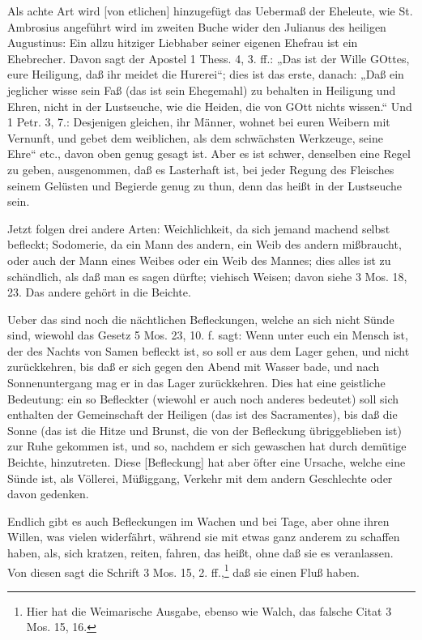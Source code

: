 Als achte Art wird [von etlichen] hinzugefügt das Uebermaß der Eheleute, wie St. Ambrosius angeführt wird im zweiten Buche wider den Julianus des heiligen Augustinus: Ein allzu hitziger Liebhaber seiner eigenen Ehefrau ist ein Ehebrecher. Davon sagt der Apostel 1 Thess. 4, 3. ff.: „Das ist der Wille GOttes, eure Heiligung, daß ihr meidet die Hurerei“; dies ist das erste, danach: „Daß ein jeglicher wisse sein Faß (das ist sein Ehegemahl) zu behalten in Heiligung und Ehren, nicht in der Lustseuche, wie die Heiden, die von GOtt nichts wissen.“ Und 1 Petr. 3, 7.: Desjenigen gleichen, ihr Männer, wohnet bei euren Weibern mit Vernunft, und gebet dem weiblichen, als dem schwächsten Werkzeuge, seine Ehre“ etc., davon oben genug gesagt ist. Aber es ist schwer, denselben eine Regel zu geben, ausgenommen, daß es Lasterhaft ist, bei jeder Regung des Fleisches seinem Gelüsten und Begierde genug zu thun, denn das heißt in der Lustseuche sein.

Jetzt folgen drei andere Arten: Weichlichkeit, da sich jemand machend selbst befleckt; Sodomerie, da ein Mann des andern, ein Weib des andern mißbraucht, oder auch der Mann eines Weibes oder ein Weib des Mannes; dies alles ist zu schändlich, als daß man es sagen dürfte; viehisch Weisen; davon siehe 3 Mos. 18, 23. Das andere gehört in die Beichte.

Ueber das sind noch die nächtlichen Befleckungen, welche an sich nicht Sünde sind, wiewohl das Gesetz 5 Mos. 23, 10. f. sagt: Wenn unter euch ein Mensch ist, der des Nachts von Samen befleckt ist, so soll er aus dem Lager gehen, und nicht zurückkehren, bis daß er sich gegen den Abend mit Wasser bade, und nach Sonnenuntergang mag er in das Lager zurückkehren. Dies hat eine geistliche Bedeutung: ein so Befleckter (wiewohl er auch noch anderes bedeutet) soll sich enthalten der Gemeinschaft der Heiligen (das ist des Sacramentes), bis daß die Sonne (das ist die Hitze und Brunst, die von der Befleckung übriggeblieben ist) zur Ruhe gekommen ist, und so, nachdem er sich gewaschen hat durch demütige Beichte, hinzutreten. Diese [Befleckung] hat aber öfter eine Ursache, welche eine Sünde ist, als Völlerei, Müßiggang, Verkehr mit dem andern Geschlechte oder davon gedenken.

Endlich gibt es auch Befleckungen im Wachen und bei Tage, aber ohne ihren Willen, was vielen widerfährt, während sie mit etwas ganz anderem zu schaffen haben, als, sich kratzen, reiten, fahren, das heißt, ohne daß sie es veranlassen. Von diesen sagt die Schrift 3 Mos. 15, 2. ff.,\footnote{Hier hat die Weimarische Ausgabe, ebenso wie Walch, das falsche Citat 3 Mos. 15, 16.} daß sie einen Fluß haben.

